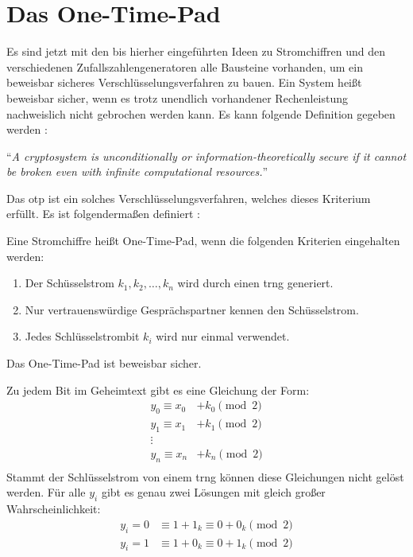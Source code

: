 \section{Das One-Time-Pad}
Es sind jetzt mit den bis hierher eingeführten Ideen zu Stromchiffren und den verschiedenen
Zufallszahlengeneratoren alle Bausteine vorhanden, um ein beweisbar
sicheres Verschlüsselungsverfahren zu bauen. Ein System heißt beweisbar sicher,
wenn es trotz unendlich vorhandener Rechenleistung nachweislich nicht gebrochen werden kann.
Es kann folgende Definition gegeben werden \parencite[36]{BOOK:crypto}:

\begin{definition}
  \enquote{\textit{A cryptosystem is unconditionally or in\-formation-theoretically
      secure if it cannot be broken even with infinite computational resources.}}
\end{definition}

\noindent
Das \ac{otp} ist ein solches Verschlüsselungsverfahren, welches dieses Kriterium
erfüllt. Es ist folgendermaßen definiert \parencite[37]{BOOK:crypto}:

\begin{definition}
  Eine Stromchiffre heißt One-Time-Pad, wenn die folgenden Kriterien eingehalten werden:
  \begin{enumerate}
    \item Der Schüsselstrom $k_1,k_2,\dots,k_n$ wird durch einen \ac{trng} generiert.
    \item Nur vertrauenswürdige Gesprächspartner kennen den Schüsselstrom.
    \item Jedes Schlüsselstrombit $k_i$ wird nur einmal verwendet.
  \end{enumerate}
  Das One-Time-Pad ist beweisbar sicher.
\end{definition}
\noindent
Zu jedem Bit im Geheimtext gibt es eine Gleichung der Form:
\begin{align*}
  y_0   \equiv x_0 & + k_0 \pmod{2} \\
  y_1   \equiv x_1 & + k_1 \pmod{2} \\
  \vdots           &                \\
  y_n   \equiv x_n & + k_n \pmod{2} \\
\end{align*}
\noindent
Stammt der Schlüsselstrom von einem \ac{trng} können diese Gleichungen nicht gelöst werden.
Für alle $y_i$ gibt es genau zwei Lösungen mit gleich großer Wahrscheinlichkeit:
\begin{align*}
  y_i = 0 & \equiv 1 + 1_k \equiv 0 + 0_k \pmod{2} \\
  y_i = 1 & \equiv 1 + 0_k \equiv 0 + 1_k \pmod{2}
\end{align*}

